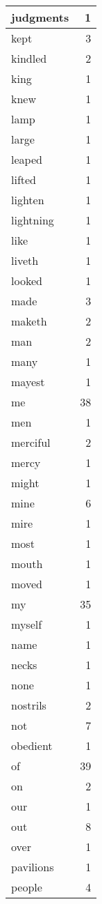 \begin{center}
\begin{longtable}{l|r}
judgments & 1 \\ \hline
kept & 3 \\ \hline
kindled & 2 \\ \hline
king & 1 \\ \hline
knew & 1 \\ \hline
lamp & 1 \\ \hline
large & 1 \\ \hline
leaped & 1 \\ \hline
lifted & 1 \\ \hline
lighten & 1 \\ \hline
lightning & 1 \\ \hline
like & 1 \\ \hline
liveth & 1 \\ \hline
looked & 1 \\ \hline
made & 3 \\ \hline
maketh & 2 \\ \hline
man & 2 \\ \hline
many & 1 \\ \hline
mayest & 1 \\ \hline
me & 38 \\ \hline
men & 1 \\ \hline
merciful & 2 \\ \hline
mercy & 1 \\ \hline
might & 1 \\ \hline
mine & 6 \\ \hline
mire & 1 \\ \hline
most & 1 \\ \hline
mouth & 1 \\ \hline
moved & 1 \\ \hline
my & 35 \\ \hline
myself & 1 \\ \hline
name & 1 \\ \hline
necks & 1 \\ \hline
none & 1 \\ \hline
nostrils & 2 \\ \hline
not & 7 \\ \hline
obedient & 1 \\ \hline
of & 39 \\ \hline
on & 2 \\ \hline
our & 1 \\ \hline
out & 8 \\ \hline
over & 1 \\ \hline
pavilions & 1 \\ \hline
people & 4 \\ \hline

\end{longtable}
\end{center}
